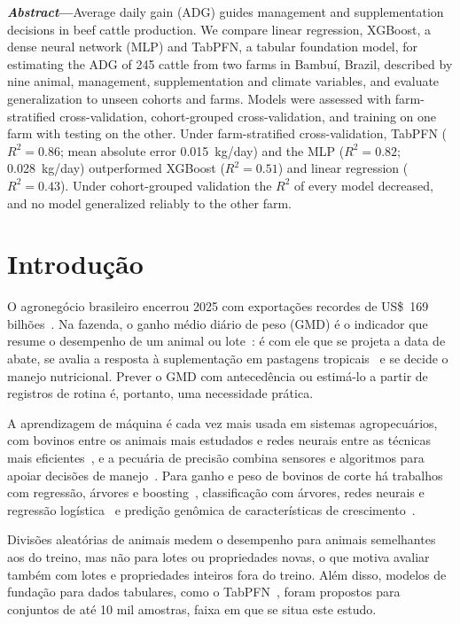 \documentclass[conference]{IEEEtran}
\begin{document}
\noindent\textbf{\textit{Abstract}---}Average daily gain (ADG) guides management and supplementation decisions in beef cattle production. We compare linear regression, XGBoost, a dense neural network (MLP) and TabPFN, a tabular foundation model, for estimating the ADG of 245 cattle from two farms in Bambuí, Brazil, described by nine animal, management, supplementation and climate variables, and evaluate generalization to unseen cohorts and farms. Models were assessed with farm-stratified cross-validation, cohort-grouped cross-validation, and training on one farm with testing on the other. Under farm-stratified cross-validation, TabPFN ($R^2 = 0.86$; mean absolute error 0.015~kg/day) and the MLP ($R^2 = 0.82$; 0.028~kg/day) outperformed XGBoost ($R^2 = 0.51$) and linear regression ($R^2 = 0.43$). Under cohort-grouped validation the $R^2$ of every model decreased, and no model generalized reliably to the other farm.

\section{Introdução}

O agronegócio brasileiro encerrou 2025 com exportações recordes de US\$~169 bilhões~\cite{ministerio2026}. Na fazenda, o ganho médio diário de peso (GMD) é o indicador que resume o desempenho de um animal ou lote~\cite{alencastrofilho2017}: é com ele que se projeta a data de abate, se avalia a resposta à suplementação em pastagens tropicais~\cite{tambara2021} e se decide o manejo nutricional. Prever o GMD com antecedência ou estimá-lo a partir de registros de rotina é, portanto, uma necessidade prática.

A aprendizagem de máquina é cada vez mais usada em sistemas agropecuários, com bovinos entre os animais mais estudados e redes neurais entre as técnicas mais eficientes~\cite{benos2021}, e a pecuária de precisão combina sensores e algoritmos para apoiar decisões de manejo~\cite{curti2023}. Para ganho e peso de bovinos de corte há trabalhos com regressão, árvores e boosting~\cite{tuyishime2025}, classificação com árvores, redes neurais e regressão logística~\cite{grzesiak2023} e predição genômica de características de crescimento~\cite{hay2024}.

Divisões aleatórias de animais medem o desempenho para animais semelhantes aos do treino, mas não para lotes ou propriedades novas, o que motiva avaliar também com lotes e propriedades inteiros fora do treino. Além disso, modelos de fundação para dados tabulares, como o TabPFN~\cite{hollmann2025tabpfn}, foram propostos para conjuntos de até 10 mil amostras, faixa em que se situa este estudo.
\end{document}
